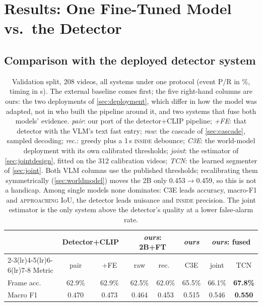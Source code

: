 \documentclass[journal]{IEEEtran}
\begin{document}
\section{Results: One Fine-Tuned Model vs.\ the Detector}
\label{sec:results}

\subsection{Comparison with the deployed detector system}
\label{sec:vsdetector}

\begin{table}[t]
\centering
\caption{Validation split, 208 videos, all systems under one protocol (event P/R in \%, timing in s).  The external baseline comes first; the five right-hand columns are ours: the two deployments of \cref{sec:deployment}, which differ in how the model was adapted, not in who built the pipeline around it, and two systems that fuse both models' evidence.  \emph{pair}: our port of the detector+CLIP pipeline; \emph{{+}FE}: that detector with the VLM's text fast entry; \emph{raw}: the cascade of \cref{sec:cascade}, sampled decoding; \emph{rec.}: greedy plus a 1\,s \textsc{inside} debounce; \emph{C3E}: the world-model deployment with its own calibrated thresholds; \emph{joint}: the estimator of \cref{sec:jointdesign}, fitted on the 312 calibration videos; \emph{TCN}: the learned segmenter of \cref{sec:joint}.  Both VLM columns use the published thresholds; recalibrating them symmetrically (\cref{sec:worldmodel}) moves the 2B only 0.453$\to$0.459, so this is not a handicap.  Among single models none dominates: C3E leads accuracy, macro-F1 and \textsc{approaching} IoU, the detector leads nuisance and \textsc{inside} precision.  The joint estimator is the only system above the detector's quality at a lower false-alarm rate.}
\label{tab:main}
\footnotesize
\setlength{\tabcolsep}{4pt}
\begin{tabular}{@{}lccccccc@{}}
\toprule
& \multicolumn{2}{c}{Detector+CLIP~\cite{priorsystem2026}} & \multicolumn{2}{c}{\emph{ours}: 2B{+}FT} & \emph{ours} & \multicolumn{2}{c}{\emph{ours}: fused} \\
\cmidrule(lr){2-3}\cmidrule(lr){4-5}\cmidrule(lr){6-6}\cmidrule(lr){7-8}
Metric & pair & {+}FE & raw & rec.\ & C3E & joint & TCN \\
\midrule
Frame acc.\ & 62.9\% & 62.9\% & 62.5\% & 62.0\% & 65.5\% & 66.1\% & \textbf{67.8\%} \\
Macro F1 & 0.470 & 0.473 & 0.464 & 0.453 & 0.515 & 0.546 & \textbf{0.550} \\

\end{tabular}
\end{table}
\end{document}
